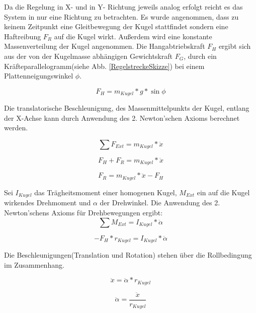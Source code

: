 \documentclass[12pt,a4paper,bibliography=totoc,listof=totoc]{scrartcl}
\begin{document}
Da die Regelung in X- und in Y- Richtung jeweils analog erfolgt reicht es das System in nur eine Richtung zu betrachten. Es wurde angenommen, dass zu keinem Zeitpunkt eine Gleitbewegung der Kugel stattfindet sondern eine Haftreibung \(F_R\)  auf die Kugel wirkt. Außerdem wird eine konstante Massenverteilung der Kugel angenommen.
Die Hangabtriebskraft \(F_H\) ergibt sich aus der von der Kugelmasse abhängigen Gewichtskraft \(F_G\), durch ein Kräfteparallelogramm(siehe Abb. \ref{RegelstreckeSkizze}) bei einem Plattenneigungswinkel \(\phi\).

\begin{equation} 
F_H = m_{Kugel} * g * \sin\phi
\label{eq:Hangabtrieb}
\end{equation}

Die translatorische Beschleunigung, des Massenmittelpunkts der Kugel, entlang der X-Achse kann durch Anwendung des 2. Newton'schen Axioms berechnet werden.

\begin{equation} 
\sum{F_{Ext}} = m_{Kugel} * \ddot{x}
\end{equation}

\begin{equation} 
F_H + F_R = m_{Kugel} * \ddot{x}
\end{equation}

\begin{equation} 
F_R = m_{Kugel} * \ddot{x} - F_H
\label{eq:Haftreibung} 
\end{equation}

Sei \(I_{Kugel}\) das Trägheitsmoment einer homogenen Kugel, \(M_{Ext}\) ein auf die Kugel wirkendes Drehmoment  und \(\alpha\) der Drehwinkel. Die Anwendung des 2. Newton'schens Axioms für Drehbewegungen ergibt:
\begin{equation} 
\sum{M_{Ext}} = I_{Kugel} * \ddot{\alpha}
\end{equation}

\begin{equation} 
-F_H * r_{Kugel} = I_{Kugel} * \ddot{\alpha}
\label{eq:Drehbewegung}
\end{equation}

Die Beschleunigungen(Translation und Rotation) stehen über die Rollbedingung im Zusammenhang.

\begin{equation} 
\ddot{x} = \ddot{\alpha} * r_{Kugel}
\end{equation}

\begin{equation} 
\ddot{\alpha} = \frac{\ddot{x}}{r_{Kugel}}
\label{eq:Winkelbeschleunigung}
\end{equation}
\end{document}

